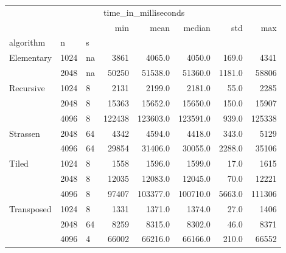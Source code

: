 \begin{tabular}{lllrrrrr}
\toprule
           &      &   & \multicolumn{5}{l}{time\_in\_milliseconds} \\
           &      &   &                  min &      mean &    median &     std &     max \\
algorithm & n & s &                      &           &           &         &         \\
\midrule
Elementary & 1024 & na &                 3861 &    4065.0 &    4050.0 &   169.0 &    4341 \\
           & 2048 & na &                50250 &   51538.0 &   51360.0 &  1181.0 &   58806 \\
Recursive & 1024 & 8 &                 2131 &    2199.0 &    2181.0 &    55.0 &    2285 \\
           & 2048 & 8 &                15363 &   15652.0 &   15650.0 &   150.0 &   15907 \\
           & 4096 & 8 &               122438 &  123603.0 &  123591.0 &   939.0 &  125338 \\
Strassen & 2048 & 64 &                 4342 &    4594.0 &    4418.0 &   343.0 &    5129 \\
           & 4096 & 64 &                29854 &   31406.0 &   30055.0 &  2288.0 &   35106 \\
Tiled & 1024 & 8 &                 1558 &    1596.0 &    1599.0 &    17.0 &    1615 \\
           & 2048 & 8 &                12035 &   12083.0 &   12045.0 &    70.0 &   12221 \\
           & 4096 & 8 &                97407 &  103377.0 &  100710.0 &  5663.0 &  111306 \\
Transposed & 1024 & 8 &                 1331 &    1371.0 &    1374.0 &    27.0 &    1406 \\
           & 2048 & 64 &                 8259 &    8315.0 &    8302.0 &    46.0 &    8371 \\
           & 4096 & 4 &                66002 &   66216.0 &   66166.0 &   210.0 &   66552 \\
\bottomrule
\end{tabular}
